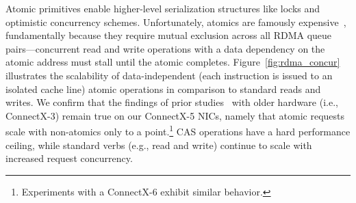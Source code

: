 Atomic primitives enable higher-level serialization structures like locks and
optimistic concurrency schemes. Unfortunately, atomics are famously
expensive~\cite{design-guidelines}, fundamentally because they require mutual
exclusion across all RDMA queue pairs---concurrent read and write operations with a data dependency on the atomic
address must stall until the atomic completes.
%
%
Figure~\ref{fig:rdma_concur} illustrates the scalability of
data-independent (each instruction is issued to an isolated cache
line) atomic operations in comparison to standard reads and writes.
We confirm that the findings of prior
studies~\cite[Fig. 14]{design-guidelines} with older hardware (i.e.,
ConnectX-3) remain true on our ConnectX-5 NICs, namely that atomic
requests scale with non-atomics only to a point.\footnote{Experiments with a ConnectX-6 exhibit similar behavior.}  CAS operations have
a hard performance ceiling, while standard verbs (e.g., read and
write) continue to scale with increased request concurrency.

%
%
%





